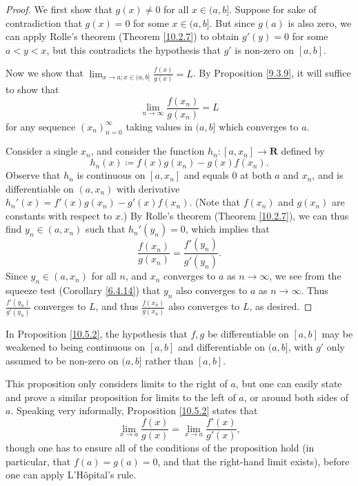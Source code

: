 \begin{proof}
    We first show that \(g(x) \neq 0\) for all \(x \in (a, b]\).
    Suppose for sake of contradiction that \(g(x) = 0\) for some \(x \in (a, b]\).
    But since \(g(a)\) is also zero, we can apply Rolle's theorem (Theorem \ref{10.2.7}) to obtain \(g'(y) = 0\) for some \(a < y < x\), but this contradicts the hypothesis that \(g'\) is non-zero on \([a, b]\).

    Now we show that \(\lim_{x \to a ; x \in (a, b]} \frac{f(x)}{g(x)} = L\).
    By Proposition \ref{9.3.9}, it will suffice to show that
    \[
        \lim_{n \to \infty} \frac{f(x_n)}{g(x_n)} = L
    \]
    for any sequence \((x_n)_{n = 0}^\infty\) taking values in \((a, b]\) which converges to \(a\).

    Consider a single \(x_n\), and consider the function \(h_n : [a, x_n] \to \mathbf{R}\) defined by
    \[
        h_n(x) \coloneqq f(x) g(x_n) - g(x) f(x_n).
    \]
    Observe that \(h_n\) is continuous on \([a, x_n]\) and equals \(0\) at both \(a\) and \(x_n\), and is differentiable on \((a, x_n)\) with derivative \(h_n'(x) = f'(x) g(x_n) - g'(x) f(x_n)\).
    (Note that \(f(x_n)\) and \(g(x_n)\) are constants with respect to \(x\).)
    By Rolle's theorem (Theorem \ref{10.2.7}), we can thus find \(y_n \in (a, x_n)\) such that \(h_n'(y_n) = 0\), which implies that
    \[
        \frac{f(x_n)}{g(x_n)} = \frac{f'(y_n)}{g'(y_n)}.
    \]
    Since \(y_n \in (a, x_n)\) for all \(n\), and \(x_n\) converges to \(a\) as \(n \to \infty\), we see from the squeeze test (Corollary \ref{6.4.14}) that \(y_n\) also converges to \(a\) as \(n \to \infty\).
    Thus \(\frac{f'(y_n)}{g'(y_n)}\) converges to \(L\), and thus \(\frac{f(x_n)}{g(x_n)}\) also converges to \(L\), as desired.
\end{proof}

\begin{note}
    In Proposition \ref{10.5.2}, the hypothesis that \(f, g\) be differentiable on \([a, b]\) may be weakened to being continuous on \([a, b]\) and differentiable on \((a, b]\), with \(g'\) only assumed to be non-zero on \((a, b]\) rather than \([a, b]\).
\end{note}

\begin{remark}\label{10.5.3}
    This proposition only considers limits to the right of \(a\), but one can easily state and prove a similar proposition for limits to the left of \(a\), or around both sides of \(a\).
    Speaking very informally, Proposition \ref{10.5.2} states that
    \[
        \lim_{x \to a} \frac{f(x)}{g(x)} = \lim_{x \to a} \frac{f'(x)}{g'(x)},
    \]
    though one has to ensure all of the conditions of the proposition hold (in particular, that \(f(a) = g(a) = 0\), and that the right-hand limit exists), before one can apply L'Hôpital's rule.
\end{remark}

